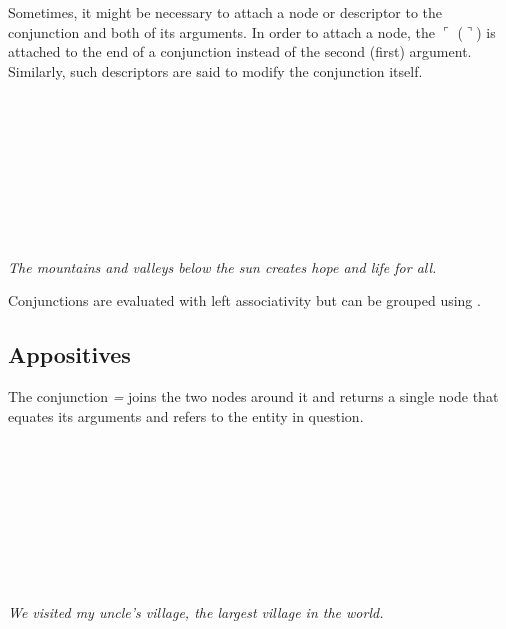 \documentclass{book}
\begin{document}
Sometimes, it might be necessary to attach a node or descriptor to the conjunction and both of its arguments. In order to attach a node, the $\ulcorner$ ($\urcorner$) is attached to the end of a conjunction instead of the second (first) argument. Similarly, such descriptors are said to modify the conjunction itself. \\
~\\
 \\
 \\
\hli{$\llcorner$}      \\
~\\
 \\
 \\
      \\
~\\
\emph{The mountains and valleys below the sun creates hope and life for all.}

Conjunctions are evaluated with left associativity but can be grouped using .

\subsection{Appositives}

The conjunction  \emph{=} joins the two nodes around it and returns a single node that equates its arguments and refers to the entity in question. \\
~\\
 \\
 \\
     \hlvi{$\lrcorner$}  \hlviii{$\lrcorner$} \hlix{=} \\
~\\
 \\
 \\
    \\
~\\
\emph{We visited my uncle's village, the largest village in the world.}
\end{document}

